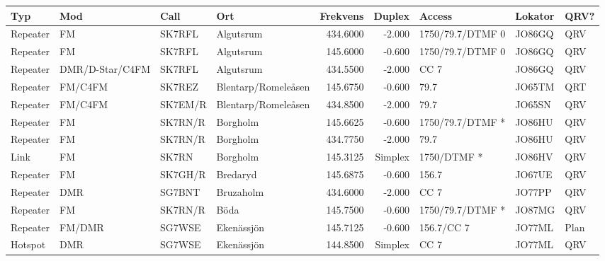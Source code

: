 \begin{landscape}
\begin{longtable}{llllrrlll}
	\bf Typ           & \bf Mod         & \bf Call & \bf Ort              & \bf Frekvens & \bf Duplex & \bf Access        & \bf Lokator & \bf QRV? \\ \hline
	\endhead
Repeater & FM              & SK7RFL   & Algutsrum            &     434.6000 &     -2.000 & 1750/79.7/DTMF 0  & JO86GQ      & QRV      \\
	Repeater          & FM              & SK7RFL   & Algutsrum            &     145.6000 &     -0.600 & 1750/79.7/DTMF 0  & JO86GQ      & QRV      \\
	Repeater          & DMR/D-Star/C4FM & SK7RFL   & Algutsrum            &     434.5500 &     -2.000 & CC 7              & JO86GQ      & QRV      \\
	Repeater          & FM/C4FM         & SK7REZ   & Blentarp/Romeleåsen  &     145.6750 &     -0.600 & 79.7              & JO65TM      & QRT      \\
	Repeater          & FM/C4FM         & SK7EM/R  & Blentarp/Romeleåsen  &     434.8500 &     -2.000 & 79.7              & JO65SN      & QRV      \\
	Repeater          & FM              & SK7RN/R  & Borgholm             &     145.6625 &     -0.600 & 1750/79.7/DTMF *  & JO86HU      & QRV      \\
	Repeater          & FM              & SK7RN/R  & Borgholm             &     434.7750 &     -2.000 & 79.7              & JO86HU      & QRV      \\
	Link              & FM              & SK7RN    & Borgholm             &     145.3125 &    Simplex & 1750/DTMF *       & JO86HV      & QRV      \\
	Repeater          & FM              & SK7GH/R  & Bredaryd             &     145.6875 &     -0.600 & 156.7             & JO67UE      & QRV      \\
	Repeater          & DMR             & SG7BNT   & Bruzaholm            &     434.6000 &     -2.000 & CC 7              & JO77PP      & QRV      \\
	Repeater          & FM              & SK7RN/R  & Böda                 &     145.7500 &     -0.600 & 1750/79.7/DTMF *  & JO87MG      & QRV      \\
	Repeater          & FM/DMR          & SG7WSE   & Ekenässjön           &     145.7125 &     -0.600 & 156.7/CC 7        & JO77ML      & Plan     \\
	Hotspot           & DMR             & SG7WSE   & Ekenässjön           &     144.8500 &    Simplex & CC 7              & JO77ML      & QRV      \\

\end{longtable}
\end{landscape}
